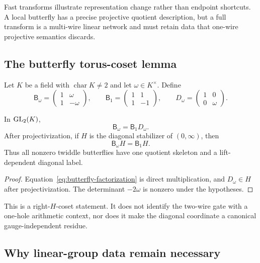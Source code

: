 Fast transforms illustrate representation change rather than endpoint
shortcuts.  A local butterfly has a precise projective quotient description,
but a full transform is a multi-wire linear network and must retain data that
one-wire projective semantics discards.

\subsection{The butterfly torus-coset lemma}

Let $K$ be a field with $\operatorname{char}K\ne2$ and let
$\omega\in K^\times$.  Define
\[
  \mathsf B_\omega=
  \begin{pmatrix}1&\omega\\1&-\omega\end{pmatrix},
  \qquad
  \mathsf B_1=
  \begin{pmatrix}1&1\\1&-1\end{pmatrix},
  \qquad
  D_\omega=
  \begin{pmatrix}1&0\\0&\omega\end{pmatrix}.
\]

\begin{proposition}
\label{prop:butterfly-coset}
In $\operatorname{GL}_2(K)$,
\begin{equation}
  \mathsf B_\omega=\mathsf B_1D_\omega.
  \label{eq:butterfly-factorization}
\end{equation}
After projectivization, if $H$ is the diagonal stabilizer of
$(0,\infty)$, then
\[
  \mathsf B_\omega H=\mathsf B_1H.
\]
Thus all nonzero twiddle butterflies have one quotient skeleton and a
lift-dependent diagonal label.
\end{proposition}

\begin{proof}
Equation~\eqref{eq:butterfly-factorization} is direct multiplication, and
$D_\omega\in H$ after projectivization.  The determinant
$-2\omega$ is nonzero under the hypotheses.
\end{proof}

This is a right-$H$-coset statement.  It does not identify the two-wire gate
with a one-hole arithmetic context, nor does it make the diagonal coordinate a
canonical gauge-independent residue.

\subsection{Why linear-group data remain necessary}

